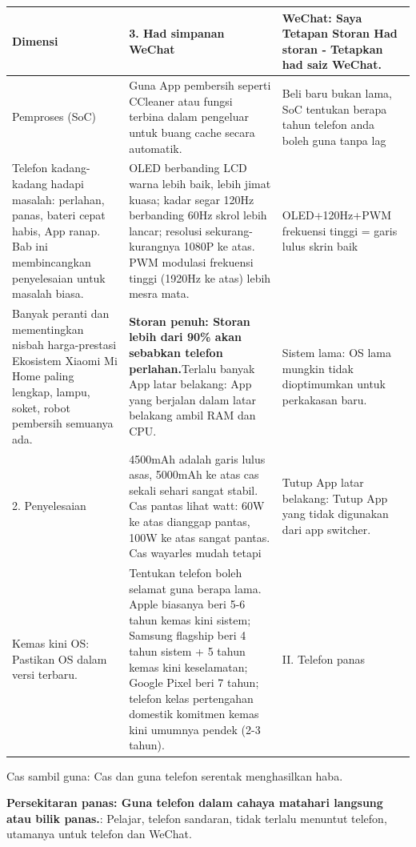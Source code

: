 \begin{center}
\begin{tabularx}{\linewidth}{|X|X|X|}
\hline
\textbf{Dimensi} & \textbf{3. Had simpanan WeChat} & \textbf{WeChat: Saya Tetapan Storan Had storan ‑ Tetapkan had saiz WeChat.} \tabularnewline
\hline
Pemproses (SoC) & Guna App pembersih seperti CCleaner atau fungsi terbina dalam pengeluar untuk buang cache secara automatik. & Beli baru bukan lama, SoC tentukan berapa tahun telefon anda boleh guna tanpa lag \tabularnewline
Telefon kadang-kadang hadapi masalah: perlahan, panas, bateri cepat habis, App ranap. Bab ini membincangkan penyelesaian untuk masalah biasa. & OLED berbanding LCD warna lebih baik, lebih jimat kuasa; kadar segar 120Hz berbanding 60Hz skrol lebih lancar; resolusi sekurang-kurangnya 1080P ke atas. PWM modulasi frekuensi tinggi (1920Hz ke atas) lebih mesra mata. & OLED+120Hz+PWM frekuensi tinggi = garis lulus skrin baik \tabularnewline
Banyak peranti dan mementingkan nisbah harga-prestasi Ekosistem Xiaomi Mi Home paling lengkap, lampu, soket, robot pembersih semuanya ada. & \textbf{Storan penuh: Storan lebih dari 90\% akan sebabkan telefon perlahan.}Terlalu banyak App latar belakang: App yang berjalan dalam latar belakang ambil RAM dan CPU. & Sistem lama: OS lama mungkin tidak dioptimumkan untuk perkakasan baru. \tabularnewline
2. Penyelesaian & 4500mAh adalah garis lulus asas, 5000mAh ke atas cas sekali sehari sangat stabil. Cas pantas lihat watt: 60W ke atas dianggap pantas, 100W ke atas sangat pantas. Cas wayarles mudah tetapi & Tutup App latar belakang: Tutup App yang tidak digunakan dari app switcher. \tabularnewline
Kemas kini OS: Pastikan OS dalam versi terbaru. & Tentukan telefon boleh selamat guna berapa lama. Apple biasanya beri 5-6 tahun kemas kini sistem; Samsung flagship beri 4 tahun sistem + 5 tahun kemas kini keselamatan; Google Pixel beri 7 tahun; telefon kelas pertengahan domestik komitmen kemas kini umumnya pendek (2-3 tahun). & II. Telefon panas \tabularnewline
\hline
\end{tabularx}
\end{center}


Cas sambil guna: Cas dan guna telefon serentak menghasilkan haba.


\textbf{Persekitaran panas: Guna telefon dalam cahaya matahari langsung atau bilik panas.}: Pelajar, telefon sandaran, tidak terlalu menuntut telefon, utamanya untuk telefon dan WeChat.

